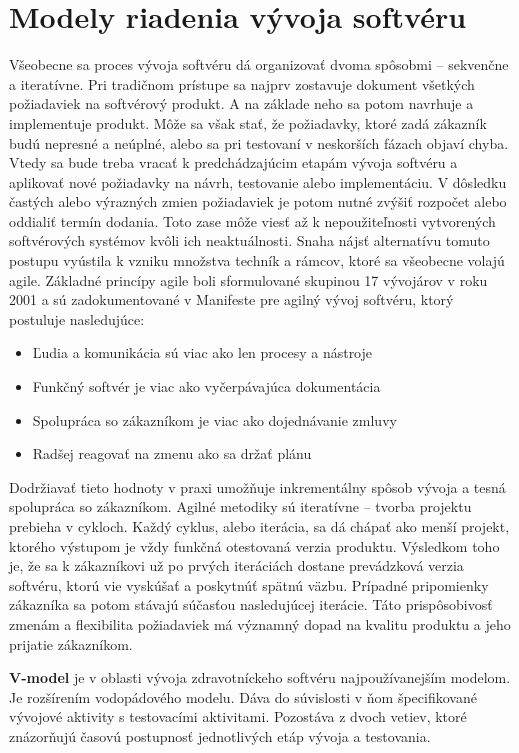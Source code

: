 \documentclass[10pt,twoside,slovak,a4paper]{article}
\begin{document}
\section{Modely riadenia vývoja softvéru}
Všeobecne sa proces vývoja softvéru dá organizovať dvoma spôsobmi – sekvenčne a iteratívne. Pri tradičnom prístupe sa najprv zostavuje dokument všetkých požiadaviek na softvérový produkt. A na základe neho sa potom navrhuje a implementuje produkt. Môže sa však stať, že požiadavky, ktoré zadá zákazník budú nepresné a neúplné, alebo sa pri testovaní v neskorších fázach objaví chyba. Vtedy sa bude treba vracať k predchádzajúcim etapám vývoja softvéru a aplikovať nové požiadavky na návrh, testovanie alebo implementáciu. V dôsledku častých alebo výrazných zmien požiadaviek je potom nutné zvýšiť rozpočet alebo oddialiť termín dodania. Toto zase môže viesť až k nepoužiteľnosti vytvorených softvérových systémov kvôli ich neaktuálnosti\cite{AVmodelPrax}. Snaha nájsť alternatívu tomuto postupu vyústila k vzniku množstva techník a rámcov, ktoré sa všeobecne volajú agile. Základné princípy agile boli sformulované skupinou 17 vývojárov v roku 2001 a sú zadokumentované v Manifeste pre agilný vývoj softvéru, ktorý postuluje nasledujúce\cite{agileManifesto}: 
\begin{itemize}
\item Ľudia a komunikácia sú viac ako len procesy a nástroje
\item Funkčný softvér je viac ako vyčerpávajúca dokumentácia
\item Spolupráca so zákazníkom je viac ako dojednávanie zmluvy
\item Radšej reagovať na zmenu ako sa držať plánu
\end{itemize}
Dodržiavať tieto hodnoty v praxi umožňuje inkrementálny spôsob vývoja a tesná spolupráca so zákazníkom. Agilné metodiky sú iteratívne – tvorba projektu prebieha v cykloch. Každý cyklus, alebo iterácia, sa dá chápať ako menší projekt, ktorého výstupom je vždy funkčná otestovaná verzia produktu. Výsledkom toho je, že sa k zákazníkovi už po prvých iteráciách dostane prevádzková verzia softvéru, ktorú vie vyskúšať a poskytnúť spätnú väzbu. Prípadné pripomienky zákazníka sa potom stávajú súčasťou nasledujúcej iterácie. Táto prispôsobivosť zmenám a flexibilita požiadaviek má významný dopad na kvalitu produktu a jeho prijatie zákazníkom. 

\textbf{V-model} je v oblasti vývoja zdravotníckeho softvéru najpoužívanejším modelom. Je rozšírením vodopádového modelu. Dáva do súvislosti v ňom špecifikované vývojové aktivity s testovacími aktivitami. Pozostáva z dvoch vetiev, ktoré znázorňujú časovú postupnosť jednotlivých etáp vývoja a testovania\cite{mchugh2013}.
\end{document}
